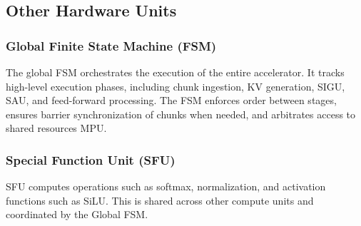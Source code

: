 \documentclass[conference]{IEEEtran}
\begin{document}
\subsection{Other Hardware Units}
\label{Sec:other_units}
\subsubsection{Global Finite State Machine (FSM)} The global FSM orchestrates the execution of the entire accelerator. It tracks high-level execution phases, including chunk ingestion, KV generation, SIGU, SAU, and feed-forward processing. The FSM enforces order between stages, ensures barrier synchronization of chunks when needed, and arbitrates access to shared resources MPU. %

\subsubsection{Special Function Unit (SFU)} SFU computes operations such as softmax, normalization, and activation functions such as SiLU. This is shared across other compute units and coordinated by the Global FSM.


\end{document}
